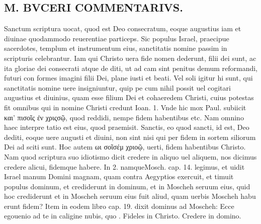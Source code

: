 \documentclass{article}
\begin{document}
\begin{pages}
\section*{M. BVCERI COMMENTARIVS.  }
\marginpar{[ p.19 ]}\pstart Sanctum scriptura uocat, quod est Deo consecratum, eoque augustius iam et diuinae quodammodo reuerentiae particeps.  Sic populus Israel, praecipue sacerdotes, templum et instrumentum eius, sanctitatis nomine passim in scripturis celebrantur.  Iam qui Christo uera fide nomen dederunt, filii dei sunt, ac ita gloriae dei consecrati atque de diti, ut ad cam sint penitus demum reformandi, futuri con formes imagini filii Dei, plane iusti et beati.  Vel soli igitur hi sunt, qui sanctitatis nomine uere insigniuntur, quip pe cum nihil possit uel cogitari augustius et diuinius, quam esse filium Dei et cohaeredem Christi, cuius potestas fit omnibus qui in nomine Christi credunt Ioan. 1.  Vnde hic mox Paul.  subiicit και' πισοῖς ἐν χριςσῷ, quod reddidi, nempe fidem habentibus etc. Nam omnino haec interpre tatio est eius, quod praemisit. Sanctis, eo quod sancti, id est, Deo dediti, eoque uere augusti et diuini, non sint nisi qui per fidem in sortem siliorum Dei ad sciti sunt.  \pend\pstart Hoc autem ωι σοῖσέμ χριοῷ, uerti, fidem habentibus Christo.  Nam quod scriptura suo idiotismo dicit credere in aliquo uel aliquem, nos dicimus credere alicui, fidemque habere.  In 2.  namqueMosch.  cap. 14. legimus, et uidit Israel manum Domini magnam, quam contra Aegyptios exercuit, et timuit populus dominum, et crediderunt in dominum, et in Moscheh seruum eius, quid hoc crediderunt et in Moscheh seruum eius fuit aliud, quam uerbis Moscheh habu erunt fidem? Item in eodem libro cap. 19. dixit dominus ad Moscheh: Ecce egouenio ad te in caligine nubis, quo  \pendSancti. Fideles in Christo. Credere in domino. 

\end{pages}
\end{document}
